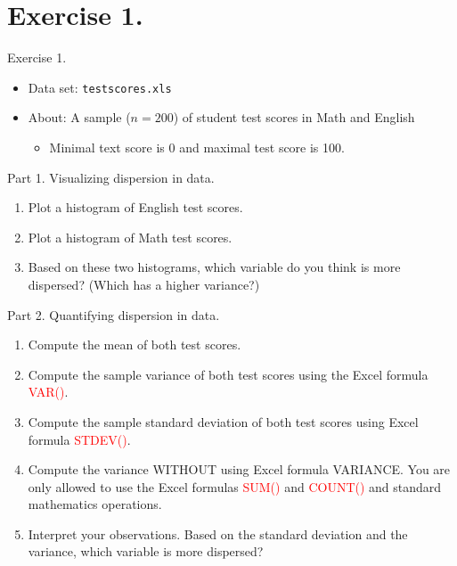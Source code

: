 \documentclass[
  10pt,
  ignorenonframetext,
]{beamer}
\providecommand{\tightlist}{%
  \setlength{\itemsep}{0pt}\setlength{\parskip}{0pt}}
\begin{document}
\hypertarget{exercise-1.}{%
\section{Exercise 1.}\label{exercise-1.}}

\begin{frame}{Exercise 1.}
\begin{itemize}
\tightlist
\item
  Data set: \texttt{testscores.xls}
\item
  About: A sample (\(n=200\)) of student test scores in Math and English

  \begin{itemize}
  \tightlist
  \item
    Minimal text score is 0 and maximal test score is 100.
  \end{itemize}
\end{itemize}
\end{frame}

\begin{frame}{Part 1. Visualizing dispersion in data.}
\protect\hypertarget{part-1.-visualizing-dispersion-in-data.}{}
\begin{enumerate}
\tightlist
\item
  Plot a histogram of English test scores.
\item
  Plot a histogram of Math test scores.
\item
  Based on these two histograms, which variable do you think is more
  dispersed? (Which has a higher variance?)
\end{enumerate}
\end{frame}

\begin{frame}{Part 2. Quantifying dispersion in data.}
\protect\hypertarget{part-2.-quantifying-dispersion-in-data.}{}
\begin{enumerate}
\tightlist
\item
  Compute the mean of both test scores.
\item
  Compute the sample variance of both test scores using the Excel
  formula \textcolor{red}{VAR()}.
\item
  Compute the sample standard deviation of both test scores using Excel
  formula \textcolor{red}{STDEV()}.
\item
  Compute the variance WITHOUT using Excel formula VARIANCE. You are
  only allowed to use the Excel formulas \textcolor{red}{SUM()} and
  \textcolor{red}{COUNT()} and standard mathematics operations.
\item
  Interpret your observations. Based on the standard deviation and the
  variance, which variable is more dispersed?
\end{enumerate}
\end{frame}
\end{document}
